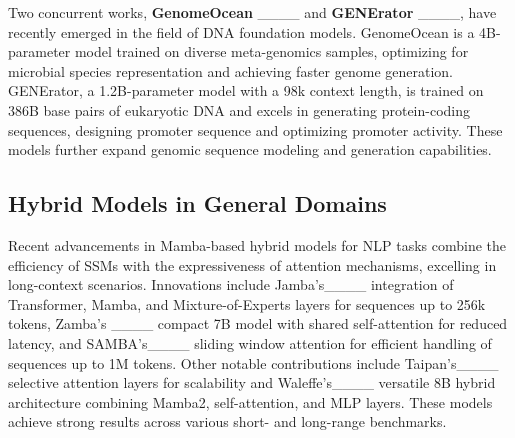 Two concurrent works, \textbf{GenomeOcean} ____ and \textbf{GENErator} ____, have recently emerged in the field of DNA foundation models. GenomeOcean is a 4B-parameter model trained on diverse meta-genomics samples, optimizing for microbial species representation and achieving faster genome generation. GENErator, a 1.2B-parameter model with a 98k context length, is trained on 386B base pairs of eukaryotic DNA and excels in generating protein-coding sequences, designing promoter sequence and optimizing promoter activity. These models further expand genomic sequence modeling and generation capabilities.

\subsection{Hybrid Models in General Domains}
Recent advancements in Mamba-based hybrid models for NLP tasks combine the efficiency of SSMs with the expressiveness of attention mechanisms, excelling in long-context scenarios. Innovations include Jamba's____ integration of Transformer, Mamba, and Mixture-of-Experts layers for sequences up to 256k tokens, 
Zamba's ____ compact 7B model with shared self-attention for reduced latency, and SAMBA's____ sliding window attention for efficient handling of sequences up to 1M tokens. Other notable contributions include Taipan's____ selective attention layers for scalability and Waleffe's____ versatile 8B hybrid architecture combining Mamba2, self-attention, and MLP layers. These models achieve strong results across various short- and long-range benchmarks.